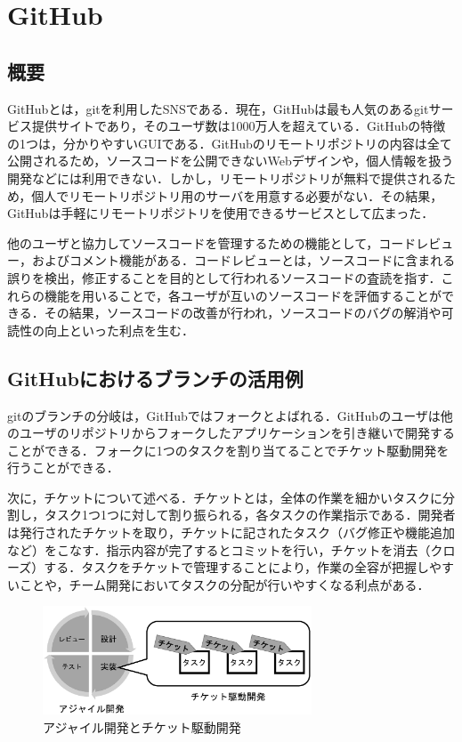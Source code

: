 \documentclass[a4j,9pt,twocolumn]{jsarticle}
\begin{document}
\section{GitHub}
\subsection{概要}
GitHubとは，gitを利用したSNSである．現在，GitHubは最も人気のあるgitサービス提供サイトであり，そのユーザ数は1000万人を超えている\cite{github}．GitHubの特徴の1つは，分かりやすいGUIである．GitHubのリモートリポジトリの内容は全て公開されるため，ソースコードを公開できないWebデザインや，個人情報を扱う開発などには利用できない．しかし，リモートリポジトリが無料で提供されるため，個人でリモートリポジトリ用のサーバを用意する必要がない．その結果，GitHubは手軽にリモートリポジトリを使用できるサービスとして広まった．

他のユーザと協力してソースコードを管理するための機能として，コードレビュー，およびコメント機能がある．コードレビューとは，ソースコードに含まれる誤りを検出，修正することを目的として行われるソースコードの査読を指す．これらの機能を用いることで，各ユーザが互いのソースコードを評価することができる．その結果，ソースコードの改善が行われ，ソースコードのバグの解消や可読性の向上といった利点を生む．

\subsection{GitHubにおけるブランチの活用例}
gitのブランチの分岐は，GitHubではフォークとよばれる．GitHubのユーザは他のユーザのリポジトリからフォークしたアプリケーションを引き継いで開発することができる．フォークに1つのタスクを割り当てることでチケット駆動開発を行うことができる．

次に，チケットについて述べる．チケットとは，全体の作業を細かいタスクに分割し，タスク1つ1つに対して割り振られる，各タスクの作業指示である．開発者は発行されたチケットを取り，チケットに記されたタスク（バグ修正や機能追加など）をこなす．指示内容が完了するとコミットを行い，チケットを消去（クローズ）する．タスクをチケットで管理することにより，作業の全容が把握しやすいことや，チーム開発においてタスクの分配が行いやすくなる利点がある．

\begin{figure}[h]
\centering
\includegraphics[width=80mm]{img/dev.eps}
\caption{アジャイル開発とチケット駆動開発}
\label{dev}
\end{figure}
\end{document}
